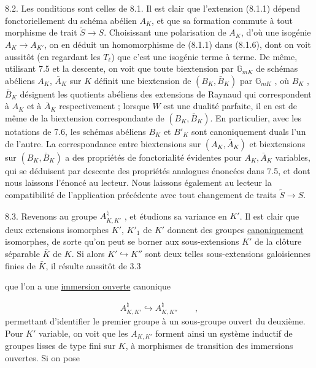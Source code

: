 
8.2. Les conditions sont celles de 8.1. Il est clair que l'extension (8.1.1) dépend fonctoriellement du schéma abélien $A_K$, et que sa formation commute à tout morphisme de trait $\tilde{S} \longrightarrow S$. Choisissant une polarisation de $A_K$, d'où une isogénie $A_K \longrightarrow A_{K'}$, on en déduit un homomorphisme de (8.1.1) dans (8.1.6), dont on voit aussitôt (en regardant les $T_\ell$) que c'est une isogénie terme à terme. De même, utilisant 7.5 et la descente, on voit que toute biextension par $\mathbb{G}_{mK}$ de schémas abéliens $A_K$, $\bar{A}_K$ sur $K$ définit une biextension de $(B_K,\bar{B}_K)$ par $\mathbb{G}_{mK}$ , où $B_K$ , $\bar{B}_K$ désignent les quotients abéliens des extensions de Raynaud qui correspondent à $A_K$ et à $\bar{A}_K$ respectivement ; lorsque $W$ est une dualité parfaite, il en est de même de la biextension correspondante de $(B_K,\bar{B}_K)$. En particulier, avec les notations de 7.6, les schémas abéliens $B_K$ et $B'_K$ sont canoniquement duals l'un de l'autre. La correspondance entre biextensions sur $(A_K,\bar{A}_K)$ et biextensions sur $(B_K, \bar{B}_K)$ a des propriétés de fonctorialité évidentes pour $A_K,\bar{A}_K$ variables, qui se déduisent par descente des propriétés analogues énoncées dans 7.5, et dont nous laissons l'énoncé au lecteur. Nous laissons également au lecteur la compatibilité de l'application précédente avec tout changement de traits $\tilde{S} \longrightarrow S$.

8.3. Revenons au groupe $A_{K,K'}^{\natural}$ , et étudions sa variance en $K'$. Il est clair que deux extensions isomorphes $K'$, $K'_1$ de $K'$ donnent des groupes \underline{canoniquement} isomorphes, de sorte qu'on peut se borner aux sous-extensions $K'$ de la clôture séparable $\bar{K}$ de $K$. Si alors $K' \hookrightarrow K''$ sont deux telles sous-extensions galoisiennes finies de $\bar{K}$, il résulte aussitôt de 3.3



que l'on a une \underline{immersion ouverte} canonique

\begin{equation}\tag{8.3.1}
A^{\natural}_{K,K'} \hookrightarrow A^{\natural}_{K,K''} \qquad ,
\end{equation}
permettant d'identifier le premier groupe à un sous-groupe ouvert du deuxième. Pour $K'$ variable, on voit que les $A_{K,K'}$ forment ainsi un système inductif de groupes lisses de type fini sur $K$, à morphismes de transition des immersions ouvertes. Si on pose

